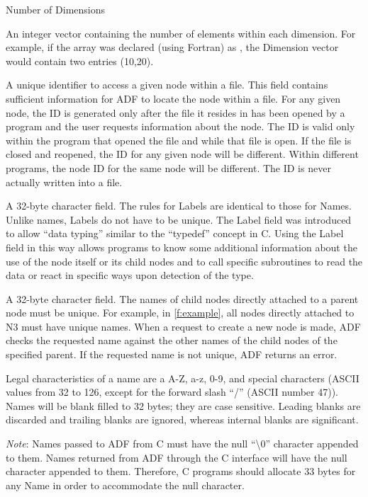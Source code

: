 \begin{Ventryi}{Number of Dimensions}
\item [Dimensions]
      An integer vector containing the number of elements within
      each dimension.
      For example, if the array  was declared (using Fortran) as
      , the Dimension vector would contain two entries
      (10,20).
\item [ID]
      A unique identifier to access a given node within a file.
      This field contains sufficient information for ADF to locate the
      node within a file.
      For any given node, the ID is generated only after the file it
      resides in has been opened by a program and the user requests
      information about the node.
      The ID is valid only within the program that opened the file and
      while that file is open.
      If the file is closed and reopened, the ID for any given node
      will be different.
      Within different programs, the node ID for the same node will be
      different.
      The ID is never actually written into a file.
\item [Label]
      A 32-byte character field.
      The rules for Labels are identical to those for Names.
      Unlike names, Labels do not have to be unique.
      The Label field was introduced to allow ``data typing'' similar to
      the ``typedef'' concept in C.
      Using the Label field in this way allows programs to know some
      additional information about the use of the node itself or its
      child nodes and to call specific subroutines to read the data or
      react in specific ways upon detection of the type.
\item [Name]
      A 32-byte character field.
      The names of child nodes directly attached to a parent node must
      be unique.
      For example, in \autoref{f:example}, all nodes directly attached
      to N3 must have unique names.
      When a request to create a new node is made, ADF checks the
      requested name against the other names of the child nodes of the
      specified parent.
      If the requested name is not unique, ADF returns an error.

      Legal characteristics of a name are a A-Z, a-z, 0-9, and special
      characters (ASCII values from 32 to 126, except for the forward
      slash ``/'' (ASCII number 47)).
      Names will be blank filled to 32 bytes; they are case sensitive.
      Leading blanks are discarded and trailing blanks are ignored,
      whereas internal blanks are significant.

      \emph{Note}: Names passed to ADF from C must have the null
      ``\textbackslash0'' character appended to them.
      Names returned from ADF through the C interface will have the
      null character appended to them.
      Therefore, C programs should allocate 33 bytes for any Name in
      order to accommodate the null character.


\end{Ventryi}
